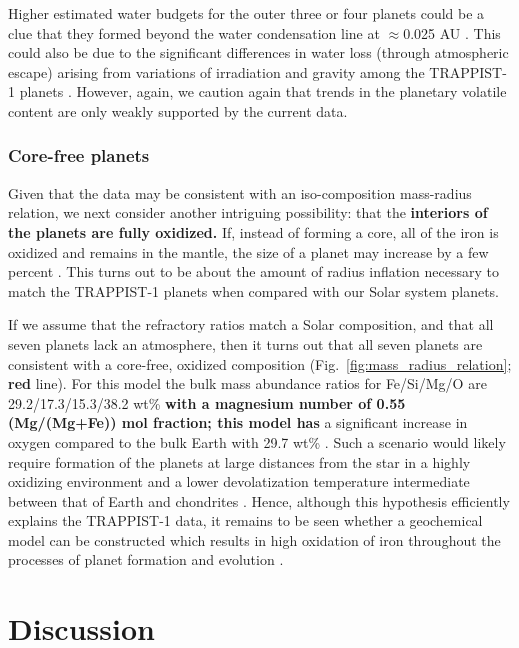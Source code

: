 \documentclass[twocolumn]{aastex63}
\begin{document}
Higher estimated water budgets for the outer three or four planets could be a clue that they formed beyond the water condensation line at $\approx$0.025 AU \citep{Unterborn2018a}. This could also be due to the significant differences in water loss (through atmospheric escape) arising from variations of irradiation and gravity among the TRAPPIST-1 planets \citep{Lissauer2007, Bolmont2017,Bourrier2017}.  However, again, we caution again that trends in the planetary volatile content are only weakly supported by the current data.

\subsubsection{Core-free planets} \label{sec:core_free}

Given that the data may be consistent with an iso-composition mass-radius relation, we next consider another intriguing possibility:
that the \textbf{interiors of the planets are fully oxidized.} If, instead of forming a core, all of the iron is oxidized and remains in the mantle, the size of a planet may increase by a few percent \citep{ElkinsTanton2008}.  This turns out to be about the amount of radius inflation necessary to match the TRAPPIST-1 planets when compared with our Solar system planets.

If we assume that the refractory ratios match a Solar composition, and that all seven planets lack an atmosphere, then it turns out that all seven planets are consistent with a core-free, oxidized composition (Fig.\ \ref{fig:mass_radius_relation}; \textbf{red} line).  For this model the bulk mass abundance ratios for Fe/Si/Mg/O are 29.2/17.3/15.3/38.2 wt\% \textbf{with a magnesium number of 0.55 (Mg/(Mg+Fe)) \textbf{mol fraction}; this model has } a significant increase in oxygen compared to the bulk Earth with 29.7 wt\% \citep{McDonough2014}.
Such a scenario would likely require formation of the planets at large distances from the star in a highly oxidizing environment \citep{ElkinsTanton2008} and a lower  devolatization temperature intermediate between that of Earth and chondrites \citep{Wang2019}.  Hence, although this hypothesis efficiently explains the TRAPPIST-1 data, it remains to be seen whether a geochemical model can be constructed which results in high oxidation of iron throughout the processes of planet formation and evolution \textbf{\citep{Kite2020}}.

\section{Discussion} \label{sec:discussion}
\end{document}
